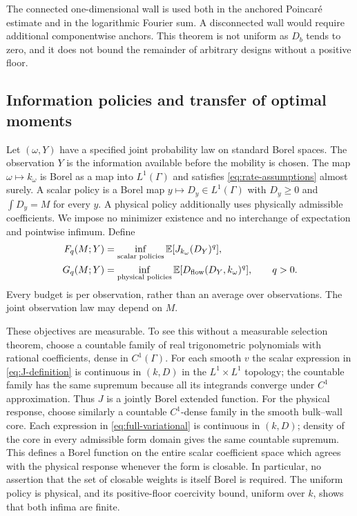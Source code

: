 The connected one-dimensional wall is used both in the anchored
Poincar\'e estimate and in the logarithmic Fourier sum. A disconnected
wall would require additional componentwise anchors. This theorem is not
uniform as $D_b$ tends to zero, and it does not bound the remainder of
arbitrary designs without a positive floor.

\subsection{Information policies and transfer of optimal moments}
\label{sec:information-transfer}
Let $(\omega,Y)$ have a specified joint probability law on standard
Borel spaces. The observation $Y$ is the information available before
the mobility is chosen. The map $\omega\mapsto k_\omega$ is Borel as a
map into $L^1(\Gamma)$ and satisfies \eqref{eq:rate-assumptions} almost
surely. A scalar policy is a Borel map $y\mapsto D_y\in L^1(\Gamma)$
with $D_y\ge0$ and $\int D_y=M$ for every $y$.
A physical policy additionally uses physically admissible coefficients.
We impose no minimizer existence and no interchange of expectation and
pointwise infimum. Define
\begin{align}
 F_q(M;Y)&=\inf_{\text{scalar policies}}
                  \mathbb E[J_{k_\omega}(D_Y)^q],\label{eq:F-definition}\\
 G_q(M;Y)&=\inf_{\text{physical policies}}
                  \mathbb E[D_{\mathrm{flow}}(D_Y,k_\omega)^q],\qquad q>0.
                  \label{eq:G-definition}
\end{align}
Every budget is per observation, rather than an average over observations.
The joint observation law may depend on $M$.

These objectives are measurable. To see this without a measurable
selection theorem, choose a countable family of real trigonometric
polynomials with rational coefficients, dense in $C^1(\Gamma)$.
For each smooth $v$ the scalar expression in \eqref{eq:J-definition}
is continuous in $(k,D)$ in the $L^1\times L^1$ topology; the countable
family has the same supremum because all its integrands converge under
$C^1$ approximation. Thus $J$ is a jointly Borel extended function.
For the physical response, choose similarly a countable $C^1$-dense
family in the smooth bulk--wall core. Each expression in
\eqref{eq:full-variational} is continuous in $(k,D)$; density of the
core in every admissible form domain gives the same countable supremum.
This defines a Borel function on the entire scalar coefficient space
which agrees with the physical response whenever the form is closable.
In particular, no assertion that the set of closable weights is itself
Borel is required. The uniform policy is physical, and its positive-floor
coercivity bound, uniform over $k$, shows that both infima are finite.

